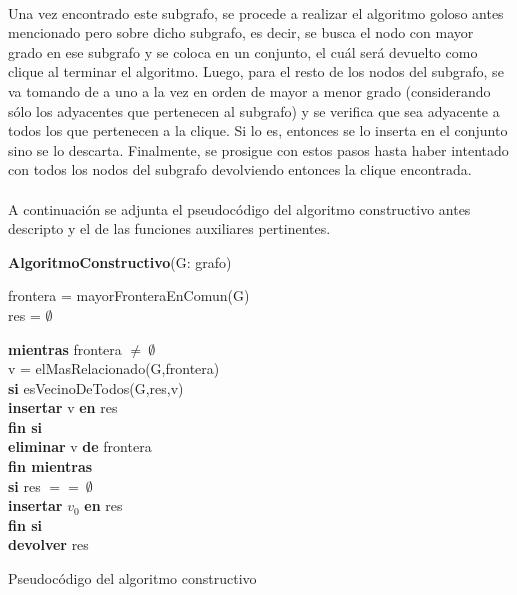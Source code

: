 \paragraph{}
Una vez encontrado este subgrafo, se procede a realizar el algoritmo goloso antes mencionado pero sobre dicho subgrafo, es decir, se busca el nodo con mayor grado en ese subgrafo y se coloca en un conjunto, el cuál será devuelto como clique al terminar el algoritmo. Luego, para el resto de los nodos del subgrafo, se va tomando de a uno a la vez en orden de mayor a menor grado (considerando sólo los adyacentes que pertenecen al subgrafo) y se verifica que sea adyacente a todos los que pertenecen a la clique. Si lo es, entonces se lo inserta en el conjunto sino se lo descarta. Finalmente, se prosigue con estos pasos hasta haber intentado con todos los nodos del subgrafo devolviendo entonces la clique encontrada.

\paragraph{}
A continuación se adjunta el pseudocódigo del algoritmo constructivo antes descripto y el de las funciones auxiliares pertinentes.

\vspace{2em}
\incmargin{3em}
\linesnumbered
{}
\footnotesize 
\textbf{AlgoritmoConstructivo}(G: grafo) \\
\begin{algorithm}[H]
	\BlankLine
	frontera = mayorFronteraEnComun(G)\\
	res = $\emptyset$
	\BlankLine

	\textbf{mientras} frontera $\neq\ \emptyset$\\

		\tab v = elMasRelacionado(G,frontera)\\
		\tab \textbf{si} esVecinoDeTodos(G,res,v)\\
			\tab \tab \textbf{insertar} v \textbf{en} res\\
		\tab \textbf{fin si}\\
		\tab \textbf{eliminar} v \textbf{de} frontera\\
	\textbf{fin mientras}\\

	\textbf{si} res $==\ \emptyset$\\
		\tab \textbf{insertar} $v_0$ \textbf{en} res\\
	\textbf{fin si}\\

	\textbf{devolver} res
\caption{Pseudocódigo del algoritmo constructivo}
\end{algorithm}


